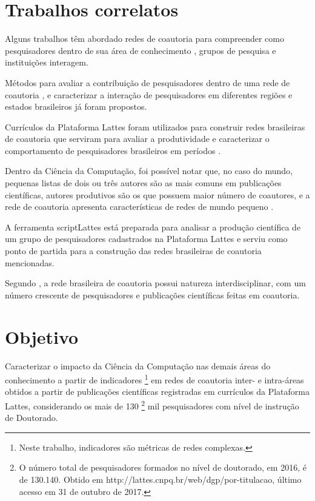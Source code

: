 \section{Trabalhos correlatos}

Alguns trabalhos têm abordado redes de coautoria para compreender como pesquisadores dentro de sua área de conhecimento \cite{mena2014brazilian} \cite{franceschet2011collaboration} \cite{santin2016collaboration}, grupos de pesquisa \cite{delgado2014analyzing} e instituições \cite{ioannidis2008measuring} interagem.

Métodos para avaliar a contribuição de pesquisadores dentro de uma rede de coautoria \cite{franceschet2011collaboration} \cite{liu2005co}, e caracterizar a interação de pesquisadores em diferentes regiões e estados brasileiros \cite{sidone2016ciencia} já foram propostos.

Currículos da Plataforma Lattes foram utilizados para construir redes brasileiras de coautoria que serviram para avaliar a produtividade e caracterizar o comportamento de pesquisadores brasileiros em períodos \cite{mena2014brazilian}.

Dentro da Ciência da Computação, foi possível notar que, no caso do mundo, pequenas listas de dois ou três autores são as mais comuns em publicações científicas, autores produtivos são os que possuem maior número de coautores, e a rede de coautoria apresenta características de redes de mundo pequeno \cite{franceschet2011collaboration}.

A ferramenta scriptLattes \cite{mena2009scriptlattes} está preparada para analisar a produção científica de um grupo de pesquisadores cadastrados na Plataforma Lattes \cite{mena2013prospecccao} e serviu como ponto de partida para a construção das redes brasileiras de coautoria mencionadas.

Segundo , a rede brasileira de coautoria possui natureza interdisciplinar, com um número crescente de pesquisadores e publicações científicas feitas em coautoria.

\section{Objetivo}

Caracterizar o impacto da Ciência da Computação nas demais áreas do conhecimento a partir de indicadores \footnote{Neste trabalho, indicadores são métricas de redes complexas.} em redes de coautoria inter- e intra-áreas obtidos a partir de publicações científicas registradas em currículos da Plataforma Lattes, considerando os mais de 130 \footnote{O número total de pesquisadores formados no nível de doutorado, em 2016, é de 130.140. Obtido em http://lattes.cnpq.br/web/dgp/por-titulacao, último acesso em 31 de outubro de 2017.} mil pesquisadores com nível de instrução de Doutorado.

